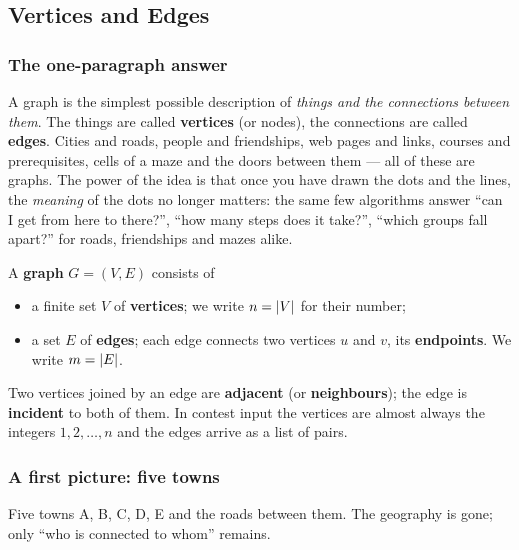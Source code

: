 \subsection{Vertices and Edges}
\label{ssec:ch1-vertices-edges}

\subsubsection*{The one-paragraph answer}

A graph is the simplest possible description of \emph{things and the connections between them}. The things are called \textbf{vertices} (or nodes), the connections are called \textbf{edges}. Cities and roads, people and friendships, web pages and links, courses and prerequisites, cells of a maze and the doors between them --- all of these are graphs. The power of the idea is that once you have drawn the dots and the lines, the \emph{meaning} of the dots no longer matters: the same few algorithms answer ``can I get from here to there?'', ``how many steps does it take?'', ``which groups fall apart?'' for roads, friendships and mazes alike.

\begin{definitionbox}
A \textbf{graph} $G=(V,E)$ consists of
\begin{itemize}[leftmargin=*]
    \item a finite set $V$ of \textbf{vertices}; we write $n=|V|$ for their number;
    \item a set $E$ of \textbf{edges}; each edge connects two vertices $u$ and $v$, its \textbf{endpoints}. We write $m=|E|$.
\end{itemize}
Two vertices joined by an edge are \textbf{adjacent} (or \textbf{neighbours}); the edge is \textbf{incident} to both of them. In contest input the vertices are almost always the integers $1,2,\dots,n$ and the edges arrive as a list of pairs.
\end{definitionbox}

\subsubsection*{A first picture: five towns}

Five towns A, B, C, D, E and the roads between them. The geography is gone; only ``who is connected to whom'' remains.

